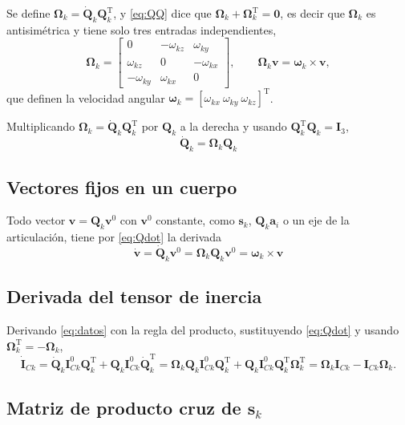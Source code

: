 \documentclass[11pt]{article}
\newcommand{\T}{^{\mathrm{T}}}
\newcommand{\wv}{\boldsymbol{\omega}}
\newcommand{\IC}[1]{\mathbf{I}_{C#1}}
\newcommand{\Om}{\boldsymbol{\Omega}}
\begin{document}
Se define $\Om_k=\dot{\mathbf{Q}}_k\mathbf{Q}_k\T$, y \eqref{eq:QQ} dice que $\Om_k+\Om_k\T=\mathbf{0}$, es decir que $\Om_k$ es antisimétrica y tiene solo tres entradas independientes,
\begin{equation}
\Om_k=\begin{bmatrix}0 & -\omega_{kz} & \omega_{ky}\\ \omega_{kz} & 0 & -\omega_{kx}\\ -\omega_{ky} & \omega_{kx} & 0\end{bmatrix},
\qquad
\Om_k\mathbf{v}=\wv_k\times\mathbf{v},
\label{eq:Omega}
\end{equation}
que definen la velocidad angular $\wv_k=[\omega_{kx}\ \omega_{ky}\ \omega_{kz}]\T$.

Multiplicando $\Om_k=\dot{\mathbf{Q}}_k\mathbf{Q}_k\T$ por $\mathbf{Q}_k$ a la derecha y usando $\mathbf{Q}_k\T\mathbf{Q}_k=\mathbf{I}_3$,
\begin{equation}
\boxed{\ \dot{\mathbf{Q}}_k=\Om_k\mathbf{Q}_k\ }
\label{eq:Qdot}
\end{equation}

\subsection{Vectores fijos en un cuerpo}

Todo vector $\mathbf{v}=\mathbf{Q}_k\mathbf{v}^0$ con $\mathbf{v}^0$ constante, como $\mathbf{s}_k$, $\mathbf{Q}_k\mathbf{a}_i$ o un eje de la articulación, tiene por \eqref{eq:Qdot} la derivada
\begin{equation}
\boxed{\ \dot{\mathbf{v}}=\dot{\mathbf{Q}}_k\mathbf{v}^0=\Om_k\mathbf{Q}_k\mathbf{v}^0=\wv_k\times\mathbf{v}\ }
\label{eq:vfijo}
\end{equation}

\subsection{Derivada del tensor de inercia}

Derivando \eqref{eq:datos} con la regla del producto, sustituyendo \eqref{eq:Qdot} y usando $\Om_k\T=-\Om_k$,
\begin{equation}
\dot{\mathbf{I}}_{Ck}
=\dot{\mathbf{Q}}_k\IC{k}^0\mathbf{Q}_k\T+\mathbf{Q}_k\IC{k}^0\dot{\mathbf{Q}}_k\T
=\Om_k\mathbf{Q}_k\IC{k}^0\mathbf{Q}_k\T+\mathbf{Q}_k\IC{k}^0\mathbf{Q}_k\T\Om_k\T
=\Om_k\IC{k}-\IC{k}\Om_k .
\label{eq:Idot}
\end{equation}

\subsection{Matriz de producto cruz de $\mathbf{s}_k$}
\end{document}
